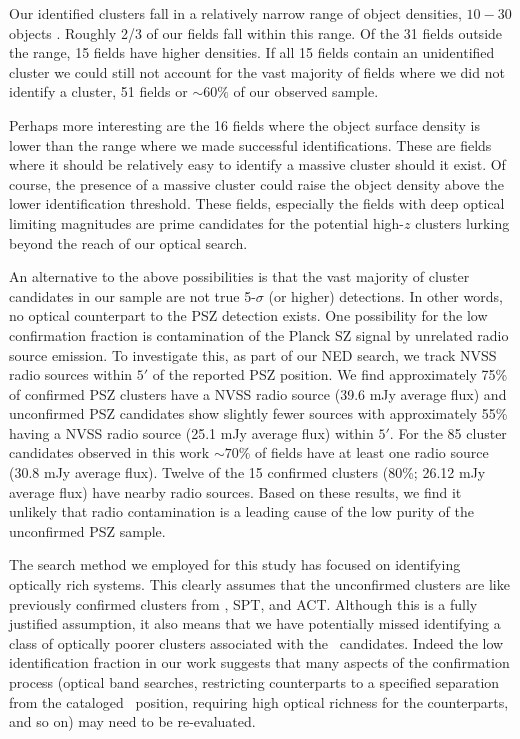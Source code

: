 \documentclass[apj, revtex4-1]{emulateapj}
\begin{document}
Our identified clusters fall in a relatively narrow range of object densities, $10-30$ objects \perarcminsq. Roughly 2/3 of our fields fall within this range. Of the 31 fields outside the range, 15 fields have higher densities. If all 15 fields contain an unidentified cluster we could still not account for the vast majority of fields where we did not identify a cluster, 51 fields or $\sim60\%$ of our observed sample.

Perhaps more interesting are the 16 fields where the object surface density is lower than the range where we made successful identifications. These are fields where it should be relatively easy to identify a massive cluster should it exist. Of course, the presence of a massive cluster could raise the object density above the lower identification threshold. These fields, especially the fields with deep optical limiting magnitudes are prime candidates for the potential high-$z$ clusters lurking beyond the reach of our optical search.

An alternative to the above possibilities is that the vast majority of cluster candidates in our sample are not true 5-$\sigma$ (or higher) detections.	In other words, no optical counterpart to the PSZ detection exists. One possibility for the low confirmation fraction is contamination of the Planck SZ signal by unrelated radio source emission. To investigate this, as part of our NED search, we track NVSS radio sources within $5'$ of the reported PSZ position. We find approximately 75\% of confirmed PSZ clusters have a NVSS radio source (39.6 mJy average flux) and unconfirmed PSZ candidates show slightly fewer sources with approximately 55\% having a NVSS radio source (25.1 mJy average flux) within $5'$. For the 85 cluster candidates observed in this work $\sim70\%$ of fields have at least one radio source (30.8 mJy average flux). Twelve of the 15 confirmed clusters (80\%; 26.12 mJy average flux) have nearby radio sources. Based on these results, we find it unlikely that radio contamination is a leading cause of the low purity of the unconfirmed PSZ sample.

The search method we employed for this study has focused on identifying optically rich systems. This clearly assumes that the unconfirmed clusters are like previously confirmed clusters from \planck, SPT, and ACT. Although this is a fully justified assumption, it also means that we have potentially missed identifying a class of optically poorer clusters associated with the \planck\ candidates. Indeed the low identification fraction in our work suggests that many aspects of the confirmation process (optical band searches, restricting counterparts to a specified separation from the cataloged \planck\ position, requiring high optical richness for the counterparts, and so on) may need to be re-evaluated.
\end{document}
